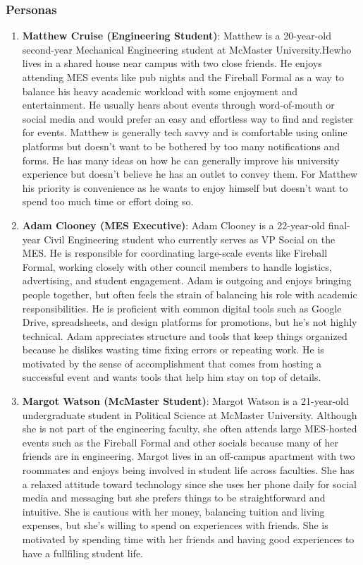 \documentclass[12pt]{article}
\begin{document}
\subsubsection{Personas}
\begin{enumerate}
  \item \textbf{Matthew Cruise (Engineering Student)}: Matthew is a 20-year-old second-year Mechanical Engineering student at McMaster University.Hewho lives in a shared house near campus with two close friends. He enjoys attending MES events like pub nights and the Fireball Formal as a way to balance his heavy academic workload with some enjoyment and entertainment. He usually hears about events through word-of-mouth or social media and would prefer an easy and effortless way to find and register for events. Matthew is generally tech savvy and is comfortable using online platforms but doesn't want to be bothered by too many notifications and forms. He has many ideas on how he can generally improve his university experience but doesn't believe he has an outlet to convey them. For Matthew his priority is convenience as he wants to enjoy himself but doesn't want to spend too much time or effort doing so.
  \item \textbf{Adam Clooney (MES Executive)}: Adam Clooney is a 22-year-old final-year Civil Engineering student who currently serves as VP Social on the MES. He is responsible for coordinating large-scale events like Fireball Formal, working closely with other council members to handle logistics, advertising, and student engagement. Adam is outgoing and enjoys bringing people together, but often feels the strain of balancing his role with academic responsibilities. He is proficient with common digital tools such as Google Drive, spreadsheets, and design platforms for promotions, but he’s not highly technical. Adam appreciates structure and tools that keep things organized because he dislikes wasting time fixing errors or repeating work. He is motivated by the sense of accomplishment that comes from hosting a successful event and wants tools that help him stay on top of details.
  \item \textbf{Margot Watson (McMaster Student)}: Margot Watson is a 21-year-old undergraduate student in Political Science at McMaster University. Although she is not part of the engineering faculty, she often attends large MES-hosted events such as the Fireball Formal and other socials because many of her friends are in engineering. Margot lives in an off-campus apartment with two roommates and enjoys being involved in student life across faculties. She has a relaxed attitude toward technology since she uses her phone daily for social media and messaging but she prefers things to be straightforward and intuitive. She is cautious with her money, balancing tuition and living expenses, but she’s willing to spend on experiences with friends. She is motivated by spending time with her friends and having good experiences to have a fullfiling student life.
\end{enumerate}
\end{document}
